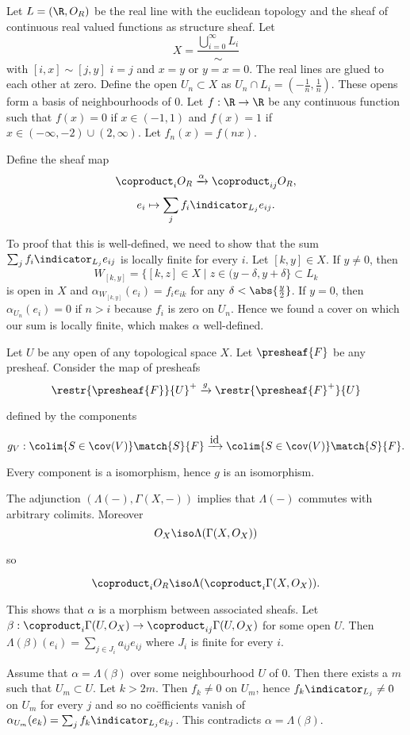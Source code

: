 Let $L = (\R, O_R)$ be the real line with the euclidean topology and the sheaf of continuous real valued functions as structure sheaf.
Let \[X = \frac{\bigcup_{i=0}^\infty L_i}{\sim}\] with $[i,x] \sim [j,y]$ \iff $i=j$ and $x=y$ or $y=x=0$. 
The real lines are glued to each other at zero.
Define the open $U_n\subset X$ as $U_n\cap L_i=(-\frac{1}{n},\frac{1}{n})$. 
These opens form a basis of neighbourhoods of $0$.
Let $f:\R\rightarrow \R$ be any continuous function such that $f(x)=0$ 
if $x\in (-1,1)$ and $f(x)=1$ if $x\in (-\infty,-2)\cup (2,\infty)$.
Let $f_n(x)=f(nx)$.

Define the sheaf map 
\[\coproduct_i O_R \xrightarrow{\alpha} \coproduct_{ij} O_R,\]
\[e_i \mapsto \sum_{j} f_i \indicator_{L_j} e_{ij}.\]

To proof that this is well-defined, we need to show that the sum $\sum_{j} f_i \indicator_{L_j} e_{ij}$ 
is locally finite for every $i$.
Let $[k,y]\in X$. If $y\neq 0$, then \[W_{[k,y]}=\{[k,z]\in X \mid z\in(y-\delta, y+\delta\}\subset L_k\] is open in $X$
and $\alpha_{W_{[k,y]}}(e_i)  = f_ie_{ik}$ for any $\delta< \abs{\frac{y}{2}}$.
If $y=0$, then $\alpha_{U_n}(e_i) = 0$ if $n>i$ because $f_i$ is zero on $U_n$.
Hence we found a cover on which our sum is locally finite, which makes $\alpha$ well-defined.


Let $U$ be any open of any topological space $X$. 
Let $\presheaf{F}$ be any presheaf.
Consider the map of presheafs
\[\restr{\presheaf{F}}{U}^{+}\xrightarrow{g} \restr{\presheaf{F}^{+}}{U}\]

defined by the components

\[g_V: \colim{S\in \cov(V)} \match{S}{F} \xrightarrow{\mbox{id}} \colim{S\in \cov(V)} \match{S}{F}.\]

Every component is a isomorphism, hence $g$ is an isomorphism.

The adjunction $(\Lambda(-),\Gamma(X,-))$ implies that $\Lambda(-)$ commutes with arbitrary colimits.
Moreover
\[O_X \iso \Lambda(\Gamma(X,O_X))\]

so

\[\coproduct_i O_R \iso \Lambda(\coproduct_i \Gamma(X,O_X)).\]

This shows that $\alpha$ is a morphism between associated sheafs.
Let $\beta: \coproduct_i \Gamma(U,O_X)\rightarrow \coproduct_{ij} \Gamma(U,O_X)$ for some open $U$.
Then $\Lambda(\beta)(e_i) = \sum_{j\in J_i} a_{ij} e_{ij}$ where $J_i$ is finite for every $i$.

Assume that $\alpha = \Lambda(\beta)$ over some neighbourhood $U$ of $0$.
Then there exists a $m$ such that $U_m\subset U$. Let $k>2m$.
Then $f_k\neq 0$ on $U_m$, hence $f_k \indicator_{L_j}\neq 0$ on $U_m$ for every $j$ and so no co{\"e}fficients vanish of $\alpha_{U_m}(e_k) =\sum_{j} f_k \indicator_{L_j} e_{kj}$. 
This contradicts $\alpha=\Lambda(\beta)$.
